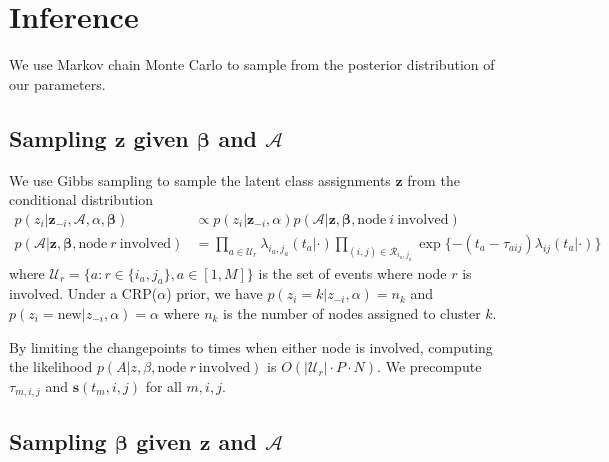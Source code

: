 \documentclass{article}
\begin{document}
\section{Inference}

We use Markov chain Monte Carlo to sample from the posterior distribution of our parameters.  

\subsection*{Sampling $\mathbf{z}$ given $\boldsymbol{\beta}$ and $\mathcal{A}$ }

We use Gibbs sampling to sample the latent class assignments $\mathbf{z}$ from the conditional distribution
\begin{align*}
p(z_i | \mathbf{z}_{-i},\mathcal{A},\alpha,\boldsymbol{\beta}) &\propto p(z_i | \mathbf{z}_{-i},\alpha) p(\mathcal{A}|\mathbf{z},\boldsymbol{\beta},\mbox{node} \ i \ \mbox{involved}) \\
p(\mathcal{A}|\mathbf{z},\boldsymbol{\beta},\mbox{node} \ r \ \mbox{involved}) &= \prod_{a \in \mathcal{U}_r} \lambda_{i_a,j_a}(t_a|\cdot)
\prod_{(i,j) \in \mathcal{R}_{i_a,j_a}} \exp \{ -(t_a - \tau_{aij}) \lambda_{ij}(t_a|\cdot)\}
\end{align*}
where $\mathcal{U}_r = \{a: r \in \{i_a,j_a\}, a \in [1,M]\}$ is the set of events where node $r$ is involved.  Under a CRP($\alpha$) prior, we have $p(z_i = k | z_{-i},\alpha) = n_k $ and $p(z_i = \mbox{new} |  z_{-i},\alpha) = \alpha$ where $n_k$ is the number of nodes assigned to cluster $k$. 


 By limiting the changepoints to times when either node is involved, computing the likelihood $p(A|z,\beta,\mbox{node} \ r \ \mbox{involved})$ is $O(|\mathcal{U}_r| \cdot P \cdot N)$.  We precompute $\tau_{m,i,j}$ and $\mathbf{s}(t_m,i,j)$ for all $m,i,j$. 


\subsection{Sampling $\boldsymbol{\beta}$ given $\mathbf{z}$ and $\mathcal{A}$ }
\end{document}
